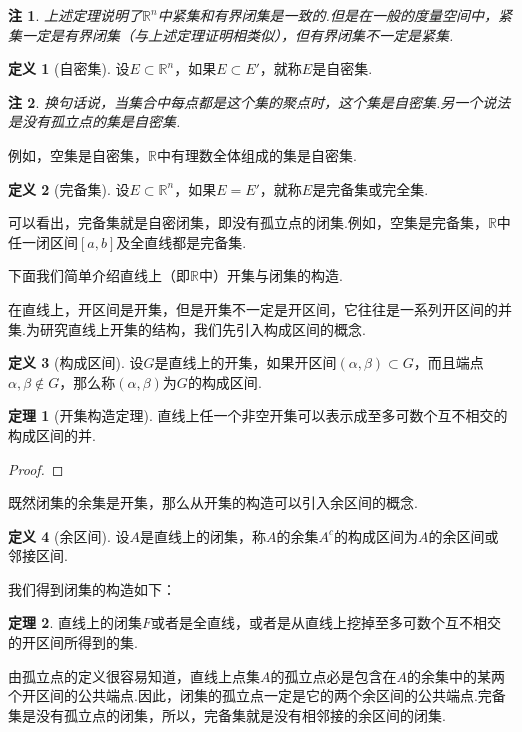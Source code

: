 \documentclass[lang=cn,12pt]{ctexart}
\theoremstyle{definition}
\newtheorem{definition}{定义}
\newtheorem{theorem}{定理}
\theoremstyle{plain}
\newtheorem*{remark}{注}
\begin{document}
\begin{remark}
	上述定理说明了$\mathbb{R}^n$中紧集和有界闭集是一致的.但是在一般的度量空间中，紧集一定是有界闭集（与上述定理证明相类似），但有界闭集不一定是紧集.
\end{remark}
\begin{definition}[自密集]
	设$E\subset\mathbb{R}^n$，如果$E\subset E'$，就称$E$是{\heiti 自密集}.
\end{definition}
\begin{remark}
	换句话说，当集合中每点都是这个集的聚点时，这个集是自密集.另一个说法是没有孤立点的集是自密集.
\end{remark}
例如，空集是自密集，$\mathbb{R}$中有理数全体组成的集是自密集.
\begin{definition}[完备集]
	设$E\subset\mathbb{R}^n$，如果$E=E'$，就称$E$是{\heiti 完备集}或{\heiti 完全集}.
\end{definition}
可以看出，完备集就是自密闭集，即没有孤立点的闭集.例如，空集是完备集，$\mathbb{R}$中任一闭区间$\left[a,b\right]$及全直线都是完备集.

下面我们简单介绍直线上（即$\mathbb{R}$中）开集与闭集的构造.

在直线上，开区间是开集，但是开集不一定是开区间，它往往是一系列开区间的并集.为研究直线上开集的结构，我们先引入构成区间的概念.
\begin{definition}[构成区间]
	设$G$是直线上的开集，如果开区间$(\alpha,\beta)\subset G$，而且端点$\alpha,\beta\notin G$，那么称$(\alpha,\beta)$为$G$的{\heiti 构成区间}.
\end{definition}
\begin{theorem}[开集构造定理]
	直线上任一个{\heiti 非空开集}可以表示成{\heiti 至多可数个}互{\heiti 不相交}的构成区间的并.
\end{theorem}
\begin{proof}
	
\end{proof}
既然闭集的余集是开集，那么从开集的构造可以引入余区间的概念.
\begin{definition}[余区间]
	设$A$是直线上的闭集，称$A$的余集$A^c$的构成区间为$A$的{\heiti 余区间}或{\heiti 邻接区间}.
\end{definition}
我们得到闭集的构造如下：
\begin{theorem}\label{wa}
	直线上的闭集$F$或者是全直线，或者是从直线上挖掉至多可数个互不相交的开区间所得到的集.
\end{theorem}
由孤立点的定义很容易知道，直线上点集$A$的孤立点必是包含在$A$的余集中的某两个开区间的公共端点.因此，闭集的孤立点一定是它的两个余区间的公共端点.完备集是没有孤立点的闭集，所以，{\heiti 完备集就是没有相邻接的余区间的闭集}.
\end{document}
